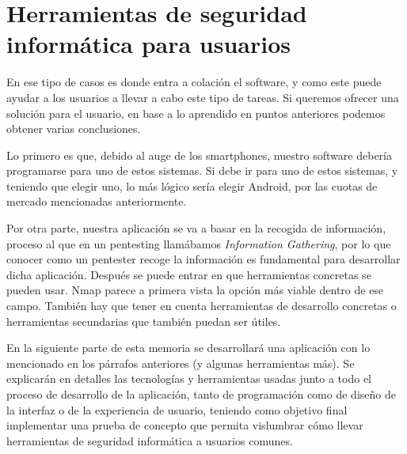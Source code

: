 \section{Herramientas de seguridad informática para usuarios}

En ese tipo de casos es donde entra a colación el software, y como este puede ayudar a los usuarios a llevar a cabo este tipo de tareas. Si queremos ofrecer una solución para el usuario, en base a lo aprendido en puntos anteriores podemos obtener varias conclusiones. 

Lo primero es que, debido al auge de los smartphones, nuestro software debería programarse para uno de estos sistemas. Si debe ir para uno de estos sistemas, y teniendo que elegir uno, lo más lógico sería elegir Android, por las cuotas de mercado mencionadas anteriormente. 

Por otra parte, nuestra aplicación se va a basar en la recogida de información, proceso al que en un pentesting llamábamos \textit{Information Gathering}, por lo que conocer como un pentester recoge la información es fundamental para desarrollar dicha aplicación. Después se puede entrar en que herramientas concretas se pueden usar. Nmap parece a primera vista la opción más viable dentro de ese campo. También hay que tener en cuenta herramientas de desarrollo concretas o herramientas secundarias que también puedan ser útiles.

En la siguiente parte de esta memoria se desarrollará una aplicación con lo mencionado en los párrafos anteriores (y algunas herramientas más). Se explicarán en detalles las tecnologías y herramientas usadas junto a todo el proceso de desarrollo de la aplicación, tanto de programación como de diseño de la interfaz o de la experiencia de usuario, teniendo como objetivo final implementar una prueba de concepto que permita vislumbrar cómo llevar herramientas de seguridad informática a usuarios comunes.
